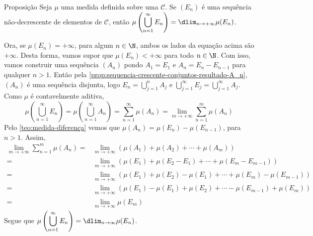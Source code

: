 \begin{env}{Proposição}
\label{prop:limite-sequencia-crescente}
Seja $\mu$ uma medida definida sobre uma \sigal $\mathcal{C}$.
Se $(E_n)$ é uma sequência não-decrescente de elementos de $\mathcal{C}$, então $\mu\left(\displaystyle \bigcup_{n = 1}^\infty E_n\right) = \dlim_{n \to +\infty} \mu(E_n)$.
\end{env} 

\begin{prova}
    Ora, se $\mu(E_n) = +\infty$, para algum $n \in \N$, ambos os lados da equação acima são $+\infty$.
    Desta forma, vamos supor que $\mu(E_n) < +\infty$ para todo $n \in \N$.
    Com isso, vamos construir uma sequência $(A_n)$ pondo $A_1 = E_1$ e $A_n = E_n - E_{n-1}$ para qualquer $n>1$.
    Então pela \ref{prop:sequencia-crescente-conjuntos-resultado-A_n}, $(A_n)$ é uma sequência disjunta, logo
    $\displaystyle E_n = \bigcup_{j = 1}^n A_j$ e 
    $\displaystyle\bigcup_{j = 1}^\infty E_j = \bigcup_{j = 1}^\infty A_j$.
    Como $\mu$ é contavelmente aditiva, 
    $$\mu\left(\bigcup_{n = 1}^\infty E_n\right)
    =\mu\left(\bigcup_{n = 1}^\infty A_n\right)
    = \sum_{n = 1}^\infty \mu(A_n)
    = \lim_{m \to +\infty}\sum_{n = 1}^m \mu(A_n)$$
    Pelo  \ref{teo:medida-diferença} vemos que $\mu(A_n) = \mu(E_n) - \mu(E_{n - 1 })$, para $n > 1$.
    Assim, 
    \begin{align*}
        \lim_{m \to +\infty}\sum_{n = 1}^m \mu(A_n)
        =&
        \lim_{m \to +\infty}(\mu(A_1) + \mu(A_2) + \cdots +\mu(A_m))\\
        =&
        \lim_{m \to +\infty}(\mu(E_1) + \mu(E_2 - E_1) + \cdots +\mu(E_m - E_{m-1}))\\
        =&
        \lim_{m \to +\infty}(\mu(E_1) + \mu(E_2) - \mu(E_1) + \cdots +\mu(E_m) - \mu(E_{m-1}))\\
        =&
        \lim_{m \to +\infty}(\mu(E_1) - \mu(E_1) + \mu(E_2)  + \cdots  - \mu(E_{m-1}) +\mu(E_m) )\\
        =&
        \lim_{m \to +\infty} \mu(E_m)
    \end{align*}
    Segue que $\mu\left(\displaystyle \bigcup_{n = 1}^\infty E_n\right) = \dlim_{n \to \infty} \mu(E_n)$.
\end{prova}

